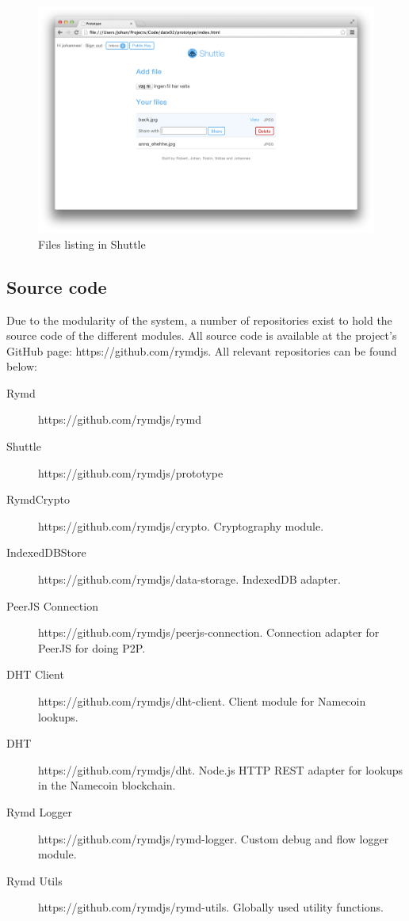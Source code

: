 \begin{figure}[h]
\centering
\includegraphics[width=\textwidth,height=0.2\paperheight,keepaspectratio
]{figures/shuttle-files}
\caption{Files listing in Shuttle}
\label{fig:shuttle-files}
\end{figure}

\subsection{Source code}

Due to the modularity of the system, a number of repositories exist to hold the source code of the different modules. All source code is available at the project's GitHub page: https://github.com/rymdjs. All relevant repositories can be found below:

\begin{description}
  \item[Rymd] https://github.com/rymdjs/rymd
  \item[Shuttle] https://github.com/rymdjs/prototype
  \item[RymdCrypto] https://github.com/rymdjs/crypto. Cryptography module.
  \item[IndexedDBStore] https://github.com/rymdjs/data-storage. IndexedDB adapter.
  \item[PeerJS Connection] https://github.com/rymdjs/peerjs-connection. Connection adapter for PeerJS for doing P2P.
  \item[DHT Client] https://github.com/rymdjs/dht-client. Client module for Namecoin lookups.
  \item[DHT] https://github.com/rymdjs/dht. Node.js HTTP REST adapter for lookups in the Namecoin blockchain.
  \item[Rymd Logger] https://github.com/rymdjs/rymd-logger. Custom debug and flow logger module.
  \item[Rymd Utils] https://github.com/rymdjs/rymd-utils. Globally used utility functions.
\end{description}

